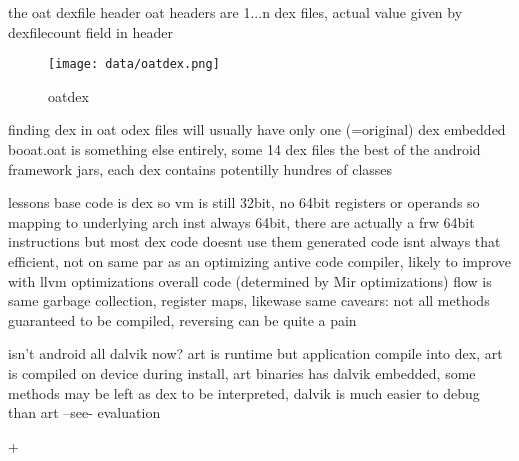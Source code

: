 the oat dexfile header
oat headers are 1...n dex files, actual value given by dexfilecount field in header
\begin{figure}[h]
    \centering
    \texttt{[image: data/oatdex.png]}
    \caption{oatdex}
    \label{fig:awesome_image122223}
\end{figure}


finding dex in oat
odex files will usually have only one (=original) dex embedded
booat.oat is something else entirely, some 14 dex files the best of the android framework jars, each dex contains potentilly hundres of classes



lessons
base code is dex so vm is still 32bit, no 64bit registers or operands so mapping to underlying arch inst always 64bit, there are actually a frw 64bit instructions but most dex code doesnt use them
generated code isnt always that efficient, not on same par as an optimizing antive code compiler, likely to improve with llvm optimizations
overall code (determined by Mir optimizations) flow is same
garbage collection, register maps, likewase same
cavears: not all methods guaranteed to be compiled, reversing can be quite a pain
\newline


isn't android all dalvik now?
art is runtime but application compile into dex, art is compiled on device during install, art binaries has dalvik embedded, some methods may be left as dex to be interpreted, dalvik is much easier to debug than art --see- evaluation \newline
\cite{andevconDalvikART}
%

+

